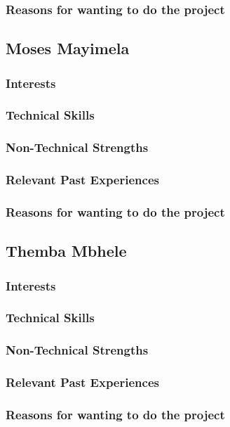 \documentclass[a4paper,12pt]{article}
\begin{document}
\subsubsection{Reasons for wanting to do the project}
\subsection{Moses Mayimela}
\subsubsection{Interests}
\subsubsection{Technical Skills}
\subsubsection{Non-Technical Strengths}
\subsubsection{Relevant Past Experiences}
\subsubsection{Reasons for wanting to do the project}
\subsection{Themba Mbhele}
\subsubsection{Interests}
\subsubsection{Technical Skills}
\subsubsection{Non-Technical Strengths}
\subsubsection{Relevant Past Experiences}
\subsubsection{Reasons for wanting to do the project}
\end{document}
